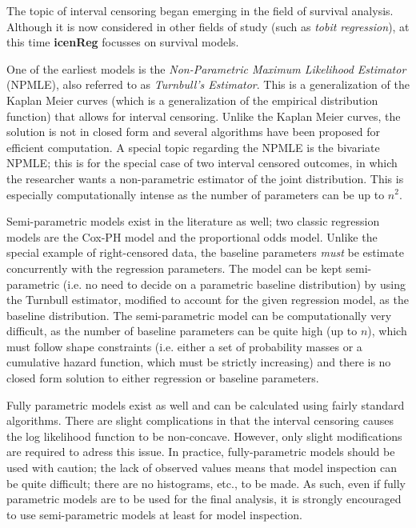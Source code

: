 \documentclass[11pt]{report}
\begin{document}
  The topic of interval censoring began emerging in the field of survival analysis. 
  Although it is now considered in other fields of study (such as \emph{tobit regression}),
  at this time {\bf{icenReg}} focusses on survival models. 
  
  
  One of the earliest models is the \emph{Non-Parametric Maximum Likelihood Estimator} 
  (NPMLE), also referred to as \emph{Turnbull's Estimator}. This is a generalization of
  the Kaplan Meier curves (which is a generalization of the empirical distribution function)
  that allows for interval censoring. Unlike the Kaplan Meier curves, the solution is not
  in closed form and several algorithms have been proposed for efficient computation. 
  A special topic regarding the NPMLE is the bivariate NPMLE; this is for the special 
  case of two interval censored outcomes, in which the researcher wants a non-parametric 
  estimator of the joint distribution. This is especially computationally intense as the
  number of parameters can be up to $n^2$. 
  
  Semi-parametric models exist in the literature as well; two classic regression models
  are the Cox-PH model and the proportional odds model. Unlike the special example
  of right-censored data, the baseline parameters \emph{must} be estimate concurrently
  with the regression parameters. The model can be kept semi-parametric (i.e. no need to 
  decide on a parametric baseline distribution) by using the Turnbull estimator, modified
  to account for the given regression model, as the baseline distribution. 
  The semi-parametric model can be computationally very difficult,
  as the number of baseline parameters can be quite high (up to $n$), which must follow
  shape constraints (i.e. either a set of probability masses or a cumulative hazard function,
  which must be strictly increasing) and there is no closed form solution to either
  regression or baseline parameters.
  
  Fully parametric models exist as well and can be calculated using fairly standard
  algorithms. There are slight complications in that the interval censoring causes the log
  likelihood function to be non-concave. However, only slight modifications are required to 
  adress this issue. In practice, fully-parametric models should be used with caution; the
  lack of observed values means that model inspection can be quite difficult; there are no
  histograms, etc., to be made. As such, even if fully parametric models are to be used for
  the final analysis, it is strongly encouraged to use semi-parametric models at least for
  model inspection. 
  
\end{document}
